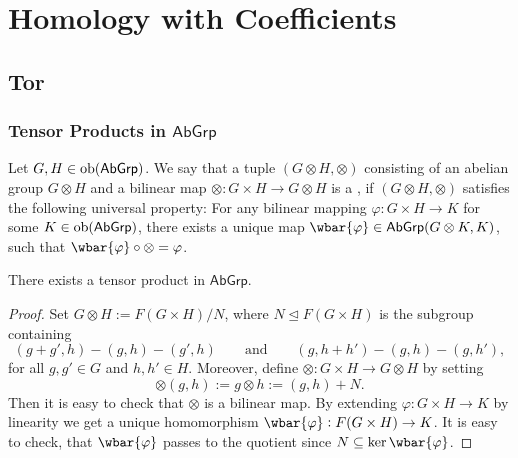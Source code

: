 \chapter{Homology with Coefficients}


\section*{Tor}
\subsection*{Tensor Products in $\mathsf{AbGrp}$}

\begin{definition}
	Let $G,H \in \operatorname{ob}(\mathsf{AbGrp})$. We say that a tuple $(G \otimes H,\otimes)$ consisting of an abelian group $G \otimes H$ and a bilinear map $\otimes : G \times H \to G \otimes H$ is a , if $(G \otimes H,\otimes)$ satisfies the following universal property: For any bilinear mapping $\varphi : G \times H \to K$ for some $K \in \operatorname{ob}(\mathsf{AbGrp})$, there exists a unique map $\wbar{\varphi} \in \mathsf{AbGrp}(G \otimes K,K)$, such that $\wbar{\varphi} \circ \otimes = \varphi$.
\end{definition}

\begin{proposition}
	There exists a tensor product in $\mathsf{AbGrp}$.
\end{proposition}

\begin{proof}
	Set $G \otimes H := F(G \times H)/N$, where $N \unlhd F(G \times H)$ is the subgroup containing 
	\begin{equation*}
		(g + g',h) - (g,h) - (g',h) \qquad \text{and} \qquad (g,h + h') - (g,h) - (g,h'),
	\end{equation*}
	\noindent for all $g,g' \in G$ and $h, h' \in H$. Moreover, define $\otimes : G \times H \to G \otimes H$ by setting
	\begin{equation*}
		\otimes(g,h) := g \otimes h := (g,h) + N.
	\end{equation*}
	Then it is easy to check that $\otimes$ is a bilinear map. By extending $\varphi : G \times H \to K$ by linearity we get a unique homomorphism $\wbar{\varphi} : F(G \times H) \to K$. It is easy to check, that $\wbar{\varphi}$ passes to the quotient since $N \subseteq \ker \wbar{\varphi}$. 
\end{proof}

